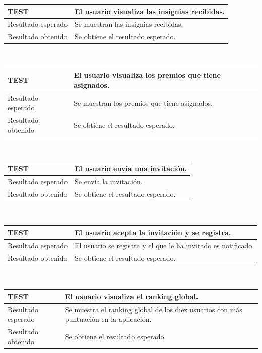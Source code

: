 \documentclass[twoside]{report}
\newcommand\addrow[2]{#1 &#2\\ }
\newcommand\addheading[2]{#1 &#2\\ \hline}
\newcommand\tabularhead{\begin{tabular}{lp{0.7\textwidth}}
\hline
}
\newenvironment{test}{\tabularhead}
{\hline\end{tabular}}
\begin{document}
\vspace{0.5cm}

\begin{test}
  \addheading{\textbf{TEST\arabic{test}}}{El usuario visualiza las insignias recibidas.} 
  \addrow{Resultado esperado}{Se muestran las insignias recibidas.}
  \addrow{Resultado obtenido}{Se obtiene el resultado esperado.}
\end{test}\\

\vspace{0.5cm}

\begin{test}
  \addheading{\textbf{TEST\arabic{test}}}{El usuario visualiza los premios que tiene asignados.} 
  \addrow{Resultado esperado}{Se muestran los premios que tiene asignados.}
  \addrow{Resultado obtenido}{Se obtiene el resultado esperado.}
\end{test}\\

\vspace{0.5cm}

\begin{test}
  \addheading{\textbf{TEST\arabic{test}}}{El usuario envía una invitación.} 
  \addrow{Resultado esperado}{Se envía la invitación.}
  \addrow{Resultado obtenido}{Se obtiene el resultado esperado.}
\end{test}\\

\vspace{0.5cm}

\begin{test}
  \addheading{\textbf{TEST\arabic{test}}}{El usuario acepta la invitación y se registra.} 
  \addrow{Resultado esperado}{El usuario se registra y el que le ha invitado es notificado.}
  \addrow{Resultado obtenido}{Se obtiene el resultado esperado.}
\end{test}\\

\vspace{0.5cm}

\begin{test}
  \addheading{\textbf{TEST\arabic{test}}}{El usuario visualiza el ranking global.} 
  \addrow{Resultado esperado}{Se muestra el ranking global de los diez usuarios con más puntuación en la aplicación.}
  \addrow{Resultado obtenido}{Se obtiene el resultado esperado.}
\end{test}\\
\end{document}
